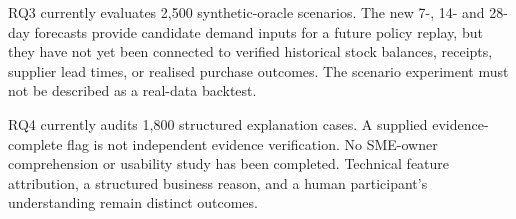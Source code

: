 RQ3 currently evaluates 2,500 synthetic-oracle scenarios. The new 7-, 14- and 28-day forecasts provide candidate demand inputs for a future policy replay, but they have not yet been connected to verified historical stock balances, receipts, supplier lead times, or realised purchase outcomes. The scenario experiment must not be described as a real-data backtest.

RQ4 currently audits 1,800 structured explanation cases. A supplied evidence-complete flag is not independent evidence verification. No SME-owner comprehension or usability study has been completed. Technical feature attribution, a structured business reason, and a human participant's understanding remain distinct outcomes.
